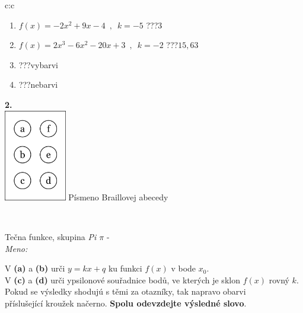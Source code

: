 \documentclass[10pt]{report}
\begin{document}
\begin{tabular}{c:c}
\begin{minipage}[c][104.5mm][t]{0.5\linewidth}
\begin{center}
\begin{minipage}{0.79\linewidth}
\begin{center}
\begin{varwidth}{\linewidth}
\begin{enumerate}
\item $f(x)=-2x^2+9x-4\enspace , \enspace k=-5$\quad \dotfill\; ???\;\dotfill \quad $3$
\item $f(x)=2x^3-6x^2-20x+3\enspace , \enspace k=-2$\quad \dotfill\; ???\;\dotfill \quad $15 , 63$
\item \quad \dotfill\; ???\;\dotfill \quad vybarvi
\item \quad \dotfill\; ???\;\dotfill \quad nebarvi
\end{enumerate}
\end{varwidth}
\end{center}
\end{minipage}
\begin{minipage}{0.20\linewidth}
\begin{center}
{\Huge\bfseries 2.} \\[2mm]
\includegraphics[height=40mm]{../images/braille.png}
{\small Písmeno Braillovej abecedy}
\end{center}
\end{minipage}
\end{center}
\end{minipage}
\\ \hdashline
\begin{minipage}[c][104.5mm][t]{0.5\linewidth}
\begin{center}
\vspace{7mm}
{\huge Tečna funkce, skupina \textit{Pi $\pi$} -}\\[5mm]
\textit{Meno:}\phantom{xxxxxxxxxxxxxxxxxxxxxxxxxxxxxxxxxxxxxxxxxxxxxxxxxxxxxxxxxxxxxxxxx}\\[5mm]
\begin{minipage}{0.95\linewidth}
\begin{center}
V \textbf{(a)} a \textbf{(b)} urči  $y = kx + q$ ku funkci $f(x)$ v bode $x_0$.\\V \textbf{(c)} a \textbf{(d)} urči ypsilonové souřadnice bodů, ve kterých je sklon $f(x)$ rovný $k$.\\Pokud se výsledky shodujú s těmi za otazníky, tak napravo obarvi\\příslušející kroužek načerno. \textbf{Spolu odevzdejte výsledné slovo}.

\end{center}
\end{minipage}
\end{center}
\end{minipage}
\end{tabular}
\end{document}
